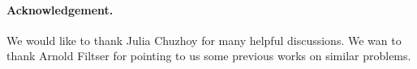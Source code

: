 \documentclass[11pt]{article}
\theoremstyle{definition}
\begin{document}






%

\appendix


\paragraph{Acknowledgement.} We would like to thank Julia Chuzhoy for many helpful discussions. We wan to thank Arnold Filtser for pointing to us some previous works on similar problems.



\end{document}
